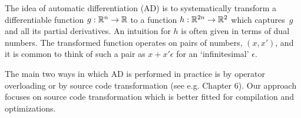 The idea of automatic differentiation (AD) is to systematically
transform a differentiable function $g:\mathbb{R}^n\to \mathbb{R}$ to a function $h:\mathbb{R}^{2n}\to \mathbb{R}^2$ which captures~$g$ and all its partial derivatives.
An intuition for $h$ is often given in terms of dual numbers.
The transformed function operates on pairs of numbers, $(x,x')$, and it is common
to think of such a pair as $x+x'\epsilon$ for an `infinitesimal' $\epsilon$.

The main two ways in which AD is performed in practice is by operator overloading or by source code transformation (see e.g. \cite{griewank2008evaluating} Chapter 6). 
Our approach focuses on source code transformation which is better fitted for compilation and optimizations.





